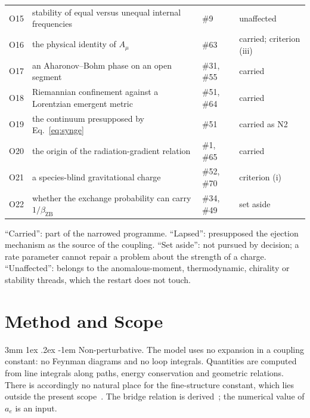 \documentclass[%
 reprint, amsmath,amssymb, aps, prb, ]{revtex4-2}
\makeatletter
\numberwithin{equation}{section}
\renewcommand\paragraph{%
  \@startsection{paragraph}{4}{\z@}%
    {3mm \@plus 1ex \@minus .2ex}%
    {-1em}%
    {\normalfont\normalsize\itshape}}
\newcommand{\betaZB}{\beta_{\text{ZB}}}
\makeatother
\begin{document}
\begin{table}[p]
\begin{tabular}{>{\raggedright\arraybackslash}p{0.7cm}>{\raggedright\arraybackslash}p{10.2cm}>{\raggedright\arraybackslash}p{2.2cm}>{\raggedright\arraybackslash}p{2.6cm}}
O15 & stability of equal versus unequal internal frequencies & \#9 & unaffected \\
O16 & the physical identity of $A_\mu$ & \#63 & \textcolor{pass}{carried}; criterion (iii) \\
O17 & an Aharonov--Bohm phase on an open segment & \#31, \#55 & \textcolor{pass}{carried} \\
O18 & Riemannian confinement against a Lorentzian emergent metric & \#51, \#64 & \textcolor{pass}{carried} \\
O19 & the continuum presupposed by Eq.~\eqref{eq:synge} & \#51 & \textcolor{pass}{carried} as N2 \\
O20 & the origin of the radiation-gradient relation & \#1, \#65 & \textcolor{pass}{carried} \\
O21 & a species-blind gravitational charge & \#52, \#70 & criterion (i) \\
O22 & whether the exchange probability can carry $1/\betaZB$ & \#34, \#49 & \textcolor{fail}{set aside} \\
\bottomrule
\end{tabular}
\vspace{0.2cm}
\begin{minipage}{0.95\textwidth}
\justifying\footnotesize
``Carried'': part of the narrowed programme. ``Lapsed'': presupposed the ejection mechanism as the source of the coupling. ``Set aside'': not pursued by decision; a rate parameter cannot repair a problem about the strength of a charge. ``Unaffected'': belongs to the anomalous-moment, thermodynamic, chirality or stability threads, which the restart does not touch.
\end{minipage}
\end{table}

\section{Method and Scope}
\label{sec:method}

\paragraph{Non-perturbative.} The model uses no expansion in a coupling constant: no Feynman diagrams and no loop integrals. Quantities are computed from line integrals along paths, energy conservation and geometric relations. There is accordingly no natural place for the fine-structure constant, which lies outside the present scope~\cite{hanamura36}. The bridge relation is derived~\cite{hanamura62}; the numerical value of $a_e$ is an input.
\end{document}
